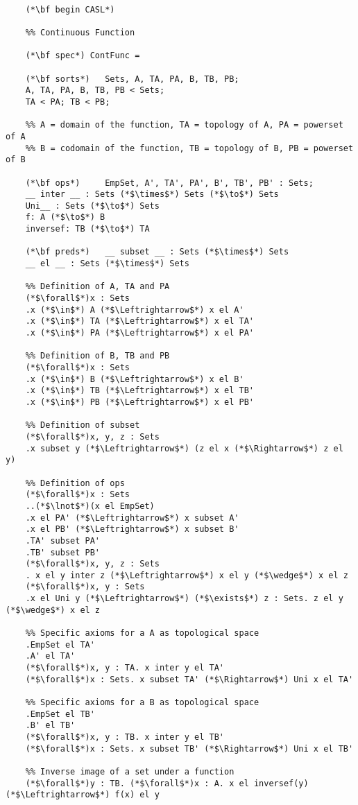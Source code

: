 \documentclass{standalone}
\begin{document}
\begin{lstlisting}
	
	(*\bf begin CASL*)
	
	%% Continuous Function 
	
	(*\bf spec*) ContFunc =
	
	(*\bf sorts*)   Sets, A, TA, PA, B, TB, PB;
	A, TA, PA, B, TB, PB < Sets;
	TA < PA; TB < PB;
	
	%% A = domain of the function, TA = topology of A, PA = powerset of A
	%% B = codomain of the function, TB = topology of B, PB = powerset of B
	
	(*\bf ops*)     EmpSet, A', TA', PA', B', TB', PB' : Sets;
	__ inter __ : Sets (*$\times$*) Sets (*$\to$*) Sets
	Uni__ : Sets (*$\to$*) Sets
	f: A (*$\to$*) B
	inversef: TB (*$\to$*) TA 
	
	(*\bf preds*)   __ subset __ : Sets (*$\times$*) Sets
	__ el __ : Sets (*$\times$*) Sets 
	
	%% Definition of A, TA and PA
	(*$\forall$*)x : Sets
	.x (*$\in$*) A (*$\Leftrightarrow$*) x el A'
	.x (*$\in$*) TA (*$\Leftrightarrow$*) x el TA'
	.x (*$\in$*) PA (*$\Leftrightarrow$*) x el PA'
	
	%% Definition of B, TB and PB
	(*$\forall$*)x : Sets
	.x (*$\in$*) B (*$\Leftrightarrow$*) x el B'
	.x (*$\in$*) TB (*$\Leftrightarrow$*) x el TB'
	.x (*$\in$*) PB (*$\Leftrightarrow$*) x el PB'
	
	%% Definition of subset
	(*$\forall$*)x, y, z : Sets
	.x subset y (*$\Leftrightarrow$*) (z el x (*$\Rightarrow$*) z el y)
	
	%% Definition of ops
	(*$\forall$*)x : Sets
	..(*$\lnot$*)(x el EmpSet)
	.x el PA' (*$\Leftrightarrow$*) x subset A'  
	.x el PB' (*$\Leftrightarrow$*) x subset B'  
	.TA' subset PA'  
	.TB' subset PB'  
	(*$\forall$*)x, y, z : Sets
	. x el y inter z (*$\Leftrightarrow$*) x el y (*$\wedge$*) x el z 
	(*$\forall$*)x, y : Sets
	.x el Uni y (*$\Leftrightarrow$*) (*$\exists$*) z : Sets. z el y (*$\wedge$*) x el z
	
	%% Specific axioms for a A as topological space
	.EmpSet el TA'
	.A' el TA'
	(*$\forall$*)x, y : TA. x inter y el TA'
	(*$\forall$*)x : Sets. x subset TA' (*$\Rightarrow$*) Uni x el TA'
	
	%% Specific axioms for a B as topological space
	.EmpSet el TB'
	.B' el TB'
	(*$\forall$*)x, y : TB. x inter y el TB'
	(*$\forall$*)x : Sets. x subset TB' (*$\Rightarrow$*) Uni x el TB'
	
	%% Inverse image of a set under a function
	(*$\forall$*)y : TB. (*$\forall$*)x : A. x el inversef(y) (*$\Leftrightarrow$*) f(x) el y 
	

\end{lstlisting}
\end{document}
